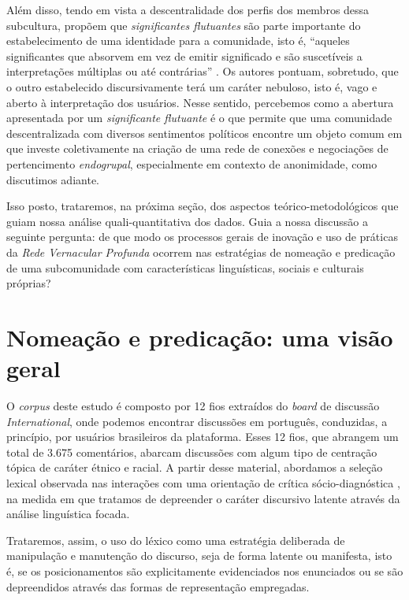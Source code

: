 \documentclass[portuguese]{textolivre}
\begin{document}
Além disso, tendo em vista a descentralidade dos perfis dos membros dessa subcultura, \textcite{tutershagen2020they} propõem que \emph{significantes flutuantes} são parte importante do estabelecimento de uma identidade para a comunidade, isto é, “aqueles significantes que absorvem em vez de emitir significado e são suscetíveis a interpretações múltiplas ou até contrárias” \cite[p. 2230]{tutershagen2020they}. Os autores pontuam, sobretudo, que o outro estabelecido discursivamente terá um caráter nebuloso, isto é, vago e aberto à interpretação dos usuários. Nesse sentido, percebemos como a abertura apresentada por um \emph{significante flutuante} é o que permite que uma comunidade descentralizada com diversos sentimentos políticos encontre um objeto comum em que investe coletivamente na criação de uma rede de conexões e negociações de pertencimento \emph{endogrupal}, especialmente em contexto de anonimidade, como discutimos adiante.

Isso posto, trataremos, na próxima seção, dos aspectos teórico-metodológicos que guiam nossa análise quali-quantitativa dos dados. Guia a nossa discussão a seguinte pergunta: de que modo os processos gerais de inovação e uso de práticas da \emph{Rede Vernacular Profunda} ocorrem nas estratégias de nomeação e predicação de uma subcomunidade com características linguísticas, sociais e culturais próprias? 



\section{Nomeação e predicação: uma visão geral}

O \emph{corpus} deste estudo é composto por 12 fios extraídos do \emph{board} de discussão \emph{International}, onde podemos encontrar discussões em português, conduzidas, a princípio, por usuários brasileiros da plataforma. Esses 12 fios, que abrangem um total de 3.675 comentários, abarcam discussões com algum tipo de centração tópica de caráter étnico e racial. A partir desse material, abordamos a seleção lexical observada nas interações com uma orientação de crítica sócio-diagnóstica \cite[p. 25]{wodakreisigl2016}, na medida em que tratamos de depreender o caráter discursivo latente através da análise linguística focada. 

Trataremos, assim, o uso do léxico como uma estratégia deliberada de manipulação e manutenção do discurso, seja de forma latente ou manifesta, isto é, se os posicionamentos são explicitamente evidenciados nos enunciados ou se são depreendidos através das formas de representação empregadas. 
\end{document}
